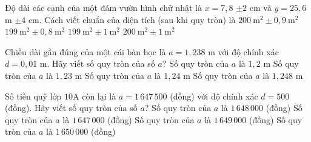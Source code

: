 \begin{ex}%
	Độ dài các cạnh của một đám vườn hình chữ nhật là $x=7{,}8$ $\pm 2$ cm và $y=25{,}6$ m $\pm 4$ cm. Cách viết chuẩn của diện tích (sau khi quy tròn) là
	\choice
	{$200\mathrm{~m}^2\pm 0{,}9\mathrm{~m}^2$}
	{$199\mathrm{~m}^2\pm 0{,}8\mathrm{~m}^2$}
	{$199\mathrm{~m}^2\pm 1\mathrm{~m}^2$}
	{\True $200\mathrm{~m}^2\pm 1\mathrm{~m}^2$}
\end{ex}
\begin{ex}%
	Chiều dài gần đúng của một cái bàn học là $a=1{,}238$ m với độ chính xác $d=0{,}01$ m. Hãy viết số quy tròn của số $a$?
	\choice
	{\True Số quy tròn của $a$ là $1{,}2$ m}
	{Số quy tròn của $a$ là $1{,}23$ m}
	{Số quy tròn của $a$ là $1{,}24$ m}
	{Số quy tròn của $a$ là $1{,}248$ m}
\end{ex}
\begin{ex}%
	Số tiền quỹ lớp $10$A còn lại là $a=1\,647\,500$ (đồng) với độ chính xác $d=500$ (đồng). Hãy viết số quy tròn của số $a$?
	\choice
	{\True Số quy tròn của $a$ là $1\,648\,000$ (đồng)}
	{Số quy tròn của $a$ là $1\,647\,000$ (đồng)}
	{Số quy tròn của $a$ là $1\,649\,000$ (đồng)}
	{Số quy tròn của $a$ là $1\,650\,000$ (đồng)}
\end{ex}


